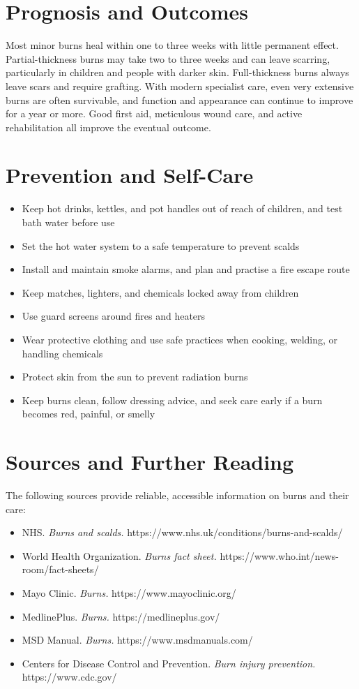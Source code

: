 \section*{Prognosis and Outcomes}
Most minor burns heal within one to three weeks with little permanent effect. Partial-thickness burns may take two to three weeks and can leave scarring, particularly in children and people with darker skin. Full-thickness burns always leave scars and require grafting. With modern specialist care, even very extensive burns are often survivable, and function and appearance can continue to improve for a year or more. Good first aid, meticulous wound care, and active rehabilitation all improve the eventual outcome.

\section*{Prevention and Self-Care}
\begin{itemize}
    \item Keep hot drinks, kettles, and pot handles out of reach of children, and test bath water before use
    \item Set the hot water system to a safe temperature to prevent scalds
    \item Install and maintain smoke alarms, and plan and practise a fire escape route
    \item Keep matches, lighters, and chemicals locked away from children
    \item Use guard screens around fires and heaters
    \item Wear protective clothing and use safe practices when cooking, welding, or handling chemicals
    \item Protect skin from the sun to prevent radiation burns
    \item Keep burns clean, follow dressing advice, and seek care early if a burn becomes red, painful, or smelly
\end{itemize}

\section*{Sources and Further Reading}
The following sources provide reliable, accessible information on burns and their care:
\begin{itemize}
    \item NHS. \textit{Burns and scalds.} https://www.nhs.uk/conditions/burns-and-scalds/
    \item World Health Organization. \textit{Burns fact sheet.} https://www.who.int/news-room/fact-sheets/
    \item Mayo Clinic. \textit{Burns.} https://www.mayoclinic.org/
    \item MedlinePlus. \textit{Burns.} https://medlineplus.gov/
    \item MSD Manual. \textit{Burns.} https://www.msdmanuals.com/
    \item Centers for Disease Control and Prevention. \textit{Burn injury prevention.} https://www.cdc.gov/
\end{itemize}
